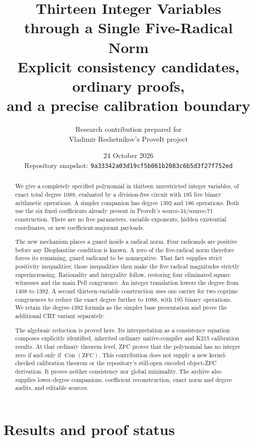 \documentclass[11pt,a4paper]{article}
\title{\vspace{-10mm}\textbf{Thirteen Integer Variables\\
through a Single Five-Radical Norm}\\[3mm]
\large Explicit consistency candidates, ordinary proofs,\\
and a precise calibration boundary}
\author{Research contribution prepared for\\Vladimir Reshetnikov's ProveIt project}
\date{24 October 2026\\\small Repository snapshot:
 \texttt{9a33342a03d19cf5b061b2083c6b5d3f27f752ed}}
\theoremstyle{definition}\newtheorem{definition}[theorem]{Definition}
\theoremstyle{remark}\newtheorem{remark}[theorem]{Remark}
\newcommand{\Con}{\operatorname{Con}}\newcommand{\Refutation}{\operatorname{Ref}}
\numberwithin{equation}{section}
\begin{document}
\maketitle
\begin{abstract}
We give a completely specified polynomial in thirteen unrestricted integer
variables, of exact total degree \(1088\), evaluated by a division-free circuit
with \(195\) live binary arithmetic operations. A simpler companion has
degree \(1392\) and \(186\) operations. Both use the six fixed
coefficients already present in ProveIt's source-34/source-71 construction.
There are no free parameters, variable exponents, hidden existential
coordinates, or new coefficient-majorant payloads.

The new mechanism places a guard inside a radical norm. Four radicands are
positive before any Diophantine condition is known. A zero of the
five-radical norm therefore forces its remaining, guard radicand to be
nonnegative. That fact supplies strict positivity inequalities; those
inequalities then make the five radical magnitudes strictly
superincreasing. Rationality and integrality follow, restoring four
eliminated square witnesses and the main Pell congruence.
An integer translation lowers the degree from \(1408\) to \(1392\).
A second thirteen-variable construction uses one carrier for two coprime
congruences to reduce the exact degree further to \(1088\), with \(195\)
binary operations. We retain the degree-\(1392\) formula as the simpler
base presentation and prove the additional CRT variant separately.

The algebraic reduction is proved here. Its interpretation as a
consistency equation composes explicitly identified, inherited ordinary
native-compiler and K215 calibration results. At that ordinary theorem
level, ZFC proves that the polynomial has no integer zero if and only if
\(\Con(\mathrm{ZFC})\). This contribution does not supply a new
kernel-checked calibration theorem or the repository's still-open
encoded object-ZFC derivation. It proves neither consistency nor global
minimality. The archive also supplies lower-degree companions,
coefficient reconstruction, exact norm and degree audits, and editable sources.
\end{abstract}
\clearpage
\begingroup\small\setlength{\parskip}{0pt}
\tableofcontents
\endgroup
\clearpage

\section{Results and proof status}
\end{document}

